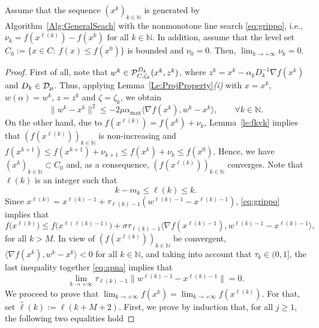\begin{proposition} \label{pr;gripponuo}
	Assume that the sequence  $(x^k)_{k\in\mathbb{N}}$ is generated by Algorithm~\ref{Alg:GeneralSeach} with the  nonmonotone line  search \eqref{eq:grippo}, i.e.,  $\nu_{k}= f(x^{\ell(k)})-f(x^k)$ for all  $k \in \mathbb{N}$. In addition,  assume that the level set $C_{0}:=\{ x\in C: ~ f(x)\leq f(x^0) \}$ is bounded and $\nu_0= 0$.  Then, $\lim_{k\to +\infty} \nu_{k} = 0$.
\end{proposition}
\begin{proof}
	First of all, note that     $w^k \in   {\cal P}_{C,\zeta_k}^{D_k}(x^{k}, z^k)$,  where $z^k = x^{k}-\alpha_k D^{-1} _k\nabla f(x^{k})$ and $D_k\in {\cal D}_{\mu}$. Thus,  applying Lemma~\ref{Le:ProjProperty}{\it (i)}  with $x=x^k$, $w(\alpha) = w^k$, $z = z^k$ and $\zeta= \zeta_k$, we obtain
	\begin{equation}\label{eq:apna}
		\|w^k-x^k\|^2\leq -2\mu \alpha_{\max}\langle \nabla f(x^{k}), w^k-x^{k}\rangle, \qquad \forall k \in \mathbb{N}.
	\end{equation}
	On the other hand, due to   $f(x^{\ell(k)})= f(x^k)+ \nu_{k}$,  Lemma~\ref{le:fkvk} implies that    $(f(x^{\ell(k)}))_{k\in\mathbb{N}}$ is    non-increasing and $  f(x^{k+1})\leq   f(x^{k+1})+\nu_{k+1}\leq f(x^{k})+\nu_{k}\leq  f(x^{0})$. Hence, we have  $(x^k)_{k\in\mathbb{N}}\subset C_{0}$ and, as a consequence,    $(f(x^{\ell(k)}))_{k\in\mathbb{N}}$ converges. Note that $\ell(k)$   is an integer such that 
	\begin{equation}\label{eq:lk}
		k-m_k\leq \ell(k)\leq k.
	\end{equation}
	Since $x^{{\ell(k)}}=x^{{\ell(k)}-1}+ \tau_{{\ell(k)}-1} (w^{{\ell(k)}-1} - x^{{\ell(k)} -1})$,  \eqref{eq:grippo}  implies that
	$$
		f\big(x^{\ell(k)}\big)  \leq f\big(x^{\ell({{\ell(k)}-1})}\big)+ \sigma \tau_{{\ell(k)}-1}\big\langle \nabla f(x^{{\ell(k)}-1}), w^{{\ell(k)}-1} - x^{{\ell(k)}-1} \big\rangle,
	$$
	for all $k>M$.  In view of   $(f(x^{\ell(k)}))_{k\in\mathbb{N}}$  be convergent, $\langle \nabla f(x^{k}), w^k - x^{k} \rangle<0$ for all  $k \in \mathbb{N}$, and taking into account that   $\tau_k  \in (0, 1]$,  the last inequality together \eqref{eq:apna} implies that
	\begin{equation}\label{eq:apcss}
		\lim_{k\to +\infty} \tau_{{\ell(k)}-1}\|w^{{\ell(k)}-1}-x^{{\ell(k)}-1}\|=0.
	\end{equation}
	We proceed to  prove that  $\lim_{k\to +\infty} f(x^{k})= \lim_{k\to +\infty} f(x^{\ell(k)})$. For that, set ${\hat \ell}(k):=\ell(k+M+2)$. First, we prove by induction that, for all  $j\geq 1$,  the following two equalities  hold

\end{proof}
